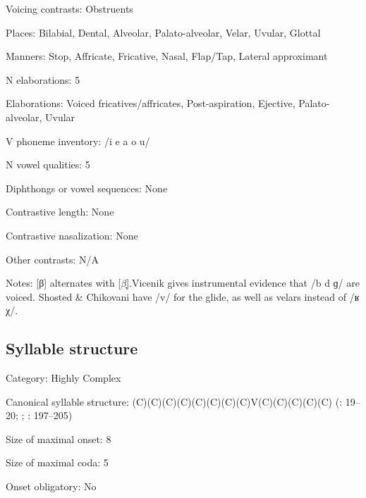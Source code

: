 {\begin{appendixdesc}
\item[Voicing contrasts:] Obstruents

\item[Places:] Bilabial, Dental, Alveolar, Palato-alveolar, Velar, Uvular, Glottal

\item[Manners:] Stop, Affricate, Fricative, Nasal, Flap/Tap, Lateral approximant

\item[N elaborations:] 5

\item[Elaborations:] Voiced fricatives/affricates, Post-aspiration, Ejective, Palato-alveolar, Uvular

\item[V phoneme inventory:] /i e a o u/

\item[N vowel qualities:] 5

\item[Diphthongs or vowel sequences:] None

\item[Contrastive length:] None

\item[Contrastive nasalization:] None

\item[Other contrasts:] N/A

\item[Notes:] [β] alternates with [$\beta ̞$].Vicenik gives instrumental evidence that /b d ɡ/ are voiced. Shosted \& Chikovani have /v/ for the glide, as well as velars instead of /ʁ χ/.
\end{appendixdesc}
\subsection*{Syllable structure}
\begin{appendixdesc}

\item[Category:] Highly Complex

\item[Canonical syllable structure:] (C)(C)(C)(C)(C)(C)(C)(C)V(C)(C)(C)(C)(C) (\citealt{Hewitt1995}: 19--20; \citealt{Vogt1958}; \citealt{Butskhrikidze2002}: 197--205)

\item[Size of maximal onset:] 8

\item[Size of maximal coda:] 5

\item[Onset obligatory:] No


\end{appendixdesc}}

